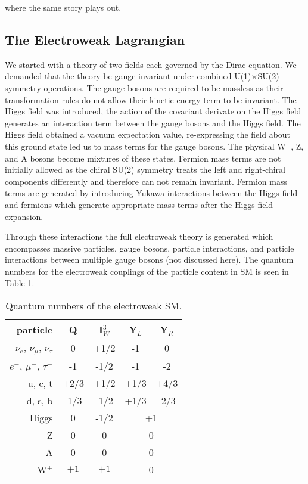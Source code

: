 where the same story plays out.

\subsection{The Electroweak Lagrangian}

We started with a theory of two fields each governed by the Dirac equation. We demanded that the theory be gauge-invariant under combined U(1)$\times$SU(2) symmetry operations. The gauge bosons are required to be massless as their transformation rules do not allow their kinetic energy term to be invariant. The Higgs field was introduced, the action of the covariant derivate on the Higgs field generates an interaction term between the gauge bosons and the Higgs field. The Higgs field obtained a vacuum expectation value, re-expressing the field about this ground state led us to mass terms for the gauge bosons. The physical W$^{\pm}$, Z, and A bosons become mixtures of these states. Fermion mass terms are not initially allowed as the chiral SU(2) symmetry treats the left and right-chiral components differently and therefore can not remain invariant. Fermion mass terms are generated by introducing Yukawa interactions between the Higgs field and fermions which generate appropriate mass terms after the Higgs field expansion.

Through these interactions the full electroweak theory is generated which encompasses massive particles, gauge bosons, particle interactions, and particle interactions between multiple gauge bosons (not discussed here). The quantum numbers for the electroweak couplings of the particle content in SM is seen in Table \ref{tab:ewkqn}.

\begin{table}
\centering
\caption{Quantum numbers of the electroweak SM.}
\begin{tabular}{ r | cccc }
\hline\hline
particle & Q & I$^{3}_{W}$ & Y$_{L}$ & Y$_{R}$ \\
\hline
$\nu_{e}$, $\nu_{\mu}$, $\nu_{\tau}$ & 0 & +1/2 & -1 & 0 \\ 
 $e^{-}$, $\mu^{-}$, $\tau^{-}$ & -1 & -1/2 & -1 & -2 \\ 
u, c, t & +2/3 & +1/2 & +1/3 & +4/3 \\ 
d, s, b & -1/3 & -1/2 & +1/3 & -2/3 \\
\hline
Higgs & 0 & -1/2 & \multicolumn{2}{c}{+1}\\
Z & 0 & 0 &  \multicolumn{2}{c}{0}\\
A & 0 & 0 &  \multicolumn{2}{c}{0}\\
W$^{\pm}$ & $\pm1$ & $\pm1$ &  \multicolumn{2}{c}{0}\\
\hline\hline
\end{tabular}
\label{tab:ewkqn}
\end{table}

